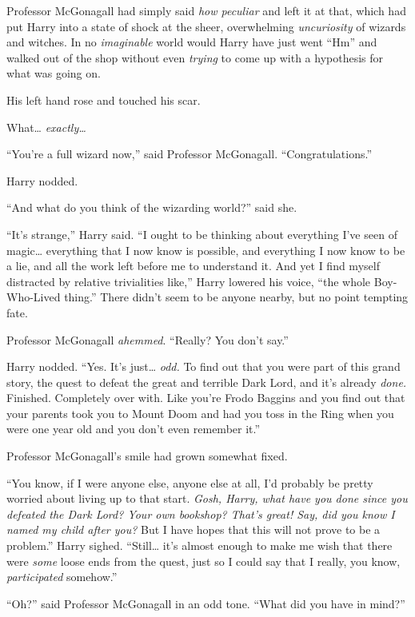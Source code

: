 Professor McGonagall had simply said \emph{how peculiar} and left it at
that, which had put Harry into a state of shock at the sheer,
overwhelming \emph{uncuriosity} of wizards and witches. In no
\emph{imaginable} world would Harry have just went ``Hm'' and walked out
of the shop without even \emph{trying} to come up with a hypothesis for
what was going on.

His left hand rose and touched his scar.

What\ldots{} \emph{exactly\ldots{}}

``You're a full wizard now,'' said Professor McGonagall.
``Congratulations.''

Harry nodded.

``And what do you think of the wizarding world?'' said she.

``It's strange,'' Harry said. ``I ought to be thinking about everything
I've seen of magic\ldots{} everything that I now know is possible, and
everything I now know to be a lie, and all the work left before me to
understand it. And yet I find myself distracted by relative trivialities
like,'' Harry lowered his voice, ``the whole Boy-Who-Lived thing.''
There didn't seem to be anyone nearby, but no point tempting fate.

Professor McGonagall \emph{ahemmed}. ``Really? You don't say.''

Harry nodded. ``Yes. It's just\ldots{} \emph{odd.} To find out that you
were part of this grand story, the quest to defeat the great and
terrible Dark Lord, and it's already \emph{done.} Finished. Completely
over with. Like you're Frodo Baggins and you find out that your parents
took you to Mount Doom and had you toss in the Ring when you were one
year old and you don't even remember it.''

Professor McGonagall's smile had grown somewhat fixed.

``You know, if I were anyone else, anyone else at all, I'd probably be
pretty worried about living up to that start. \emph{Gosh, Harry, what
have you done since you defeated the Dark Lord? Your own bookshop?
That's great! Say, did you know I named my child after you?} But I have
hopes that this will not prove to be a problem.'' Harry sighed.
``Still\ldots{} it's almost enough to make me wish that there were
\emph{some} loose ends from the quest, just so I could say that I
really, you know, \emph{participated} somehow.''

``Oh?'' said Professor McGonagall in an odd tone. ``What did you have in
mind?''

